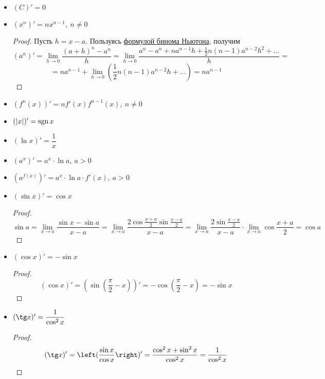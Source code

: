 \begin{itemize}
	\item $(C)' = 0$
	
	\item $(x^n)' = nx^{n-1}, \ n \neq 0$
	\begin{proof}
	Пусть $h = x - a$.
	Пользуясь \hyperref[eq:binomial_expansion]{формулой бинома Ньютона}, получим
	\begin{equation*}
	(a^n)' =
	\lim_{h \to 0} \frac{(a + h)^n - a^n}h =
	\lim_{h \to 0} \frac{a^n - a^n + n a^{n-1} h + \frac12 n(n - 1) a^{n-2} h^2 + \ldots}h =
	\end{equation*}
	\begin{equation*}
	= n a^{n-1} + \lim_{h \to 0} \left( \frac12 n(n - 1) a^{n-2} h + \ldots \right) =
	n a^{n-1}
	\end{equation*}
	\end{proof}
	
	\item $(f^n(x))' = nf'(x)f^{n-1}(x), \ n \neq 0$
	
	\item $(|x|)' = \operatorname{sgn} x$
		
	\item $(\ln x)' = \dfrac1x$
	
	\item $(a^x)' = a^x \cdot \ln a, \ a > 0$
	
	\item $(a^{f(x)})' = a^x \cdot \ln a \cdot f'(x), \ a > 0$
	
	\item $(\sin x)' = \cos x$
	\begin{proof}
	\begin{equation*}
	\sin a =
	\lim_{x \to a} \frac{\sin x - \sin a}{x - a} =
	\lim_{x \to a} \frac{2 \cos \frac{x + a}2 \sin \frac{x - a}2}{x - a} =
	\lim_{x \to a} \frac{2 \sin \frac{x - a}2}{x - a} \cdot \lim_{x \to a} \cos \frac{x + a}2 =
	\cos a
	\end{equation*}
	\end{proof}
	
	\item $(\cos x)' = -\sin x$
	\begin{proof}
	\begin{equation*}
	(\cos x)' =
	(\sin \left( \frac\pi{2} - x \right))' =
	-\cos \left( \frac\pi{2} - x \right) =
	-\sin x
	\end{equation*}
	\end{proof}
	
	\item $(\tg x)' = \dfrac1{\cos^2 x}$
	\begin{proof}
	\begin{equation*}
	(\tg x)' =
	\left( \frac{\sin x}{\cos x} \right)' =
	\frac{\cos^2 x + \sin^2 x}{\cos^2 x} =
	\frac1{\cos^2 x}
	\end{equation*}
	\end{proof}
	

\end{itemize}

